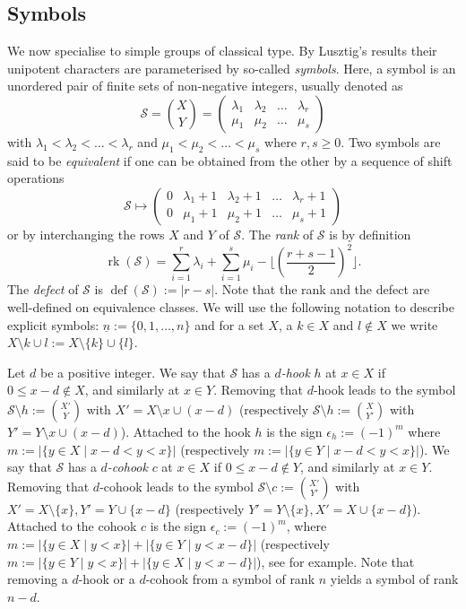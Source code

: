 \documentclass{ert-l}
\newcommand{\cS}{{\mathcal{S}}}
\newcommand{\df}{{\operatorname{def}}}
\newcommand{\rk}{{\operatorname{rk}}}
\newcommand{\ul}[1]{\underline{#1}}
\let\eps=\epsilon
\let\la=\lambda
\let\sm=\setminus
\theoremstyle{definition}
\theoremstyle{remark}
\begin{document}
\subsection{Symbols}  \label{subsec:symb}
We now specialise to simple groups of classical type. By Lusztig's results
their unipotent characters are parameterised by so-called \emph{symbols}.
Here, a symbol is an unordered pair of finite sets of non-negative integers,
usually denoted as
$$\cS=\binom{X}{Y}=\begin{pmatrix} \la_1& \la_2& \ldots& \la_r\\
  \mu_1& \mu_2& \ldots& \mu_s\end{pmatrix}$$
with $\la_1<\la_2<\ldots<\la_r$ and $\mu_1<\mu_2<\ldots<\mu_s$ where $r,s\ge0$.
Two symbols are said to be \emph{equivalent} if one can be obtained from the
other by a sequence of shift operations
$$\cS\mapsto \begin{pmatrix} 0& \la_1+1& \la_2+1& \ldots& \la_r+1\\
  0& \mu_1+1& \mu_2+1& \ldots& \mu_s+1\end{pmatrix}$$
or by interchanging the rows $X$ and $Y$ of $\cS$. The \emph{rank} of $\cS$ is
by definition
$$\rk(\cS)=\sum_{i=1}^r \la_i+\sum_{i=1}^s\mu_i
  -\Big\lfloor\left(\frac{r+s-1}{2}\right)^2\Big\rfloor.$$
The \emph{defect} of $\cS$ is $\df(\cS):=|r-s|$. Note that the rank and the
defect are well-defined on equivalence classes.
We will use the following notation to describe explicit symbols:
$\ul{n} := \{0,1,\ldots,n\}$ and for a set $X$, a $k\in X$ and $l\notin X$ we
write $X \sm k \cup l := X \sm\{k\} \cup \{l\}$.

\par
Let $d$ be a positive integer. We say that $\cS$ has a \emph{$d$-hook} $h$ at
$x\in X$ if $0\le x-d\notin X$, and similarly at $x\in Y$. Removing that
$d$-hook leads to the symbol $\cS\sm{h}:=\binom{X'}{Y}$ with
$X'=X\sm x\cup(x-d)$ (respectively $\cS\sm{h}:=\binom{X}{Y'}$
with $Y'=Y\sm x\cup(x-d)$). Attached to the hook $h$ is the sign
$\eps_h:=(-1)^m$ where $m:=|\{y\in X\mid x-d<y<x\}|$ (respectively
$m:=|\{y\in Y\mid x-d<y<x\}|$). We say that $\cS$ has a \emph{$d$-cohook} $c$
at $x\in X$ if $0\le x-d\notin Y$, and similarly at $x\in Y$.  Removing that
$d$-cohook leads to the symbol $\cS\sm{c}:=\binom{X'}{Y'}$ with
$X'=X\sm\{x\},Y'=Y\cup\{x-d\}$ (respectively $Y'=Y\sm\{x\},
X'=X\cup\{x-d\}$). Attached to the cohook $c$ is the sign $\eps_c:=(-1)^m$,
where $m:=|\{y\in X\mid y<x\}|+|\{y\in Y\mid y<x-d\}|$ (respectively
$m:=|\{y\in Y\mid y<x\}|+|\{y\in X\mid y<x-d\}|$), see \cite[\S3]{FS86} for
example. Note that removing a $d$-hook or a $d$-cohook from a symbol of rank
$n$ yields a symbol of rank $n-d$.
\end{document}
